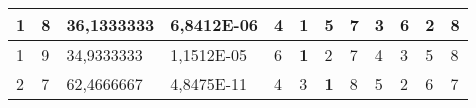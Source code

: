 \documentclass[conference]{IEEEtran}
\begin{document}
\begin{table*}[]
\begin{tabular}{|llll|llllllll|}
\multicolumn{1}{|l|}{1}                                                     & \multicolumn{1}{l|}{8}                                                        & \multicolumn{1}{l|}{36,1333333}                                                   & 6,8412E-06                     & \multicolumn{1}{l|}{4}                                                  & \multicolumn{1}{l|}{\textbf{1}}                                         & \multicolumn{1}{l|}{5}                                                  & \multicolumn{1}{l|}{7}                                                  & \multicolumn{1}{l|}{3}                                                  & \multicolumn{1}{l|}{6}                                                  & \multicolumn{1}{l|}{2}                                                  & 8                          \\ \hline
\multicolumn{1}{|l|}{1}                                                     & \multicolumn{1}{l|}{9}                                                        & \multicolumn{1}{l|}{34,9333333}                                                   & 1,1512E-05                     & \multicolumn{1}{l|}{6}                                                  & \multicolumn{1}{l|}{\textbf{1}}                                         & \multicolumn{1}{l|}{2}                                                  & \multicolumn{1}{l|}{7}                                                  & \multicolumn{1}{l|}{4}                                                  & \multicolumn{1}{l|}{3}                                                  & \multicolumn{1}{l|}{5}                                                  & 8                          \\ \hline
\multicolumn{1}{|l|}{2}                                                     & \multicolumn{1}{l|}{7}                                                        & \multicolumn{1}{l|}{62,4666667}                                                   & 4,8475E-11                     & \multicolumn{1}{l|}{4}                                                  & \multicolumn{1}{l|}{3}                                                  & \multicolumn{1}{l|}{\textbf{1}}                                         & \multicolumn{1}{l|}{8}                                                  & \multicolumn{1}{l|}{5}                                                  & \multicolumn{1}{l|}{2}                                                  & \multicolumn{1}{l|}{6}                                                  & 7                          \\ \hline

\end{tabular}
\end{table*}
\end{document}
